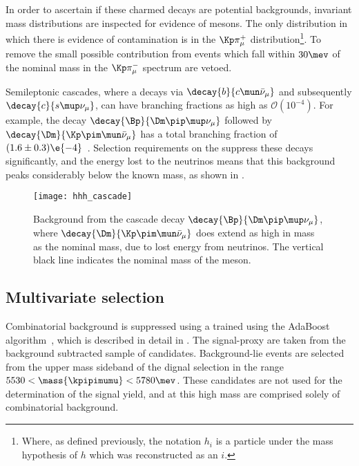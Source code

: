 In order to ascertain if these charmed decays are potential backgrounds, invariant mass
distributions are inspected for evidence of \Dz mesons.
The only distribution in which there is evidence of contamination is in the
$\Kp\pi^+_\mu$ distribution\footnote{
  Where, as defined previously, the notation $h_i$ is a particle under the mass hypothesis of $h$
  which was reconstructed as an $i$.
}.
To remove the small possible contribution from \decay{\Bd}{\Dzb\pip\pipi} events which fall within
$30\mev$ of the nominal \Dz mass in the $\Kp\pi^-_\mu$ spectrum are vetoed.



Semileptonic cascades, where a \bquark decays via $\decay{b}{c\mun\bar\nu_\mu}$ and subsequently
$\decay{c}{s\mup\nu_\mu}$, can have branching fractions as high as $\mathcal{O}(10^{-4})$.
For example, the decay $\decay{\Bp}{\Dm\pip\mup\nu_\mu}$ followed by
$\decay{\Dm}{\Kp\pim\mun\bar\nu_\mu}$ has a total branching fraction of
$(1.6\pm0.3)\e{-4}$~\cite{PDG2014}.
Selection requirements on the \chisqvtx suppress these decays significantly, and the energy lost to
the neutrinos means that this background peaks considerably below the known \Bp mass, as shown in
.

\begin{figure}
  \begin{center}
    \texttt{[image: hhh\_cascade]}
    \caption{\small
      Background from the cascade decay $\decay{\Bp}{\Dm\pip\mup\nu_\mu}$, where
      $\decay{\Dm}{\Kp\pim\mun\bar\nu_\mu}$ does extend as high in mass as the nominal \Bp mass,
      due to lost energy from neutrinos.
      The vertical black line indicates the nominal mass of the \Bp meson.
    }
    \label{fig:hhh:cascade}
  \end{center}
\end{figure}


\subsection{Multivariate selection}
\label{sec:hhh:bdt}
Combinatorial background is suppressed using a \BDT trained using the AdaBoost
algorithm~\cite{AdaBoost}, which is described in detail in .
The signal-proxy are taken from the background subtracted sample of \btojpsikpipi candidates.
Background-lie events are selected from the upper mass sideband of the dignal selection in the
range $5530<\mass{\kpipimumu}<5780\mev$.
These candidates are not used for the determination of the signal yield, and at this high mass are
comprised solely of combinatorial background.

